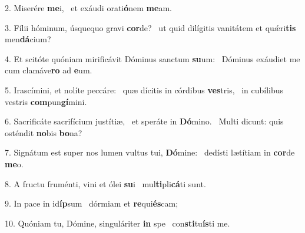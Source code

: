 2. Miserére \textbf{me}i, \ast\  et exáudi orati\textbf{ó}nem \textbf{me}am.\

3. Fílii hóminum, úsquequo gravi \textbf{cor}de? \ast\  ut quid dilígitis vanitátem et quǽri\textbf{tis} men\textbf{dá}cium?\

4. Et scitóte quóniam mirificávit Dóminus sanctum \textbf{su}um: \ast\  Dóminus exáudiet me cum clamáve\textbf{ro} ad \textbf{e}um.\

5. Irascímini, et nolíte peccáre: \dag\  quæ dícitis in córdibus \textbf{ves}tris, \ast\  in cubílibus vestris \textbf{com}pun\textbf{gí}mini.\

6. Sacrificáte sacrifícium justítiæ, \dag\  et speráte in \textbf{Dó}mino. \ast\  Multi dicunt: quis osténdit \textbf{no}bis \textbf{bo}na?\

7. Signátum est super nos lumen vultus tui, \textbf{Dó}mine: \ast\  dedísti lætítiam in \textbf{cor}de \textbf{me}o.\

8. A fructu fruménti, vini et ólei \textbf{su}i \ast\  mul\textbf{ti}pli\textbf{cá}ti sunt.\

9. In pace in id\textbf{íp}sum \ast\  dórmiam et \textbf{re}qui\textbf{és}cam;\

10. Quóniam tu, Dómine, singuláriter \textbf{in} spe \ast\  con\textbf{sti}tu\textbf{ís}ti me.\

